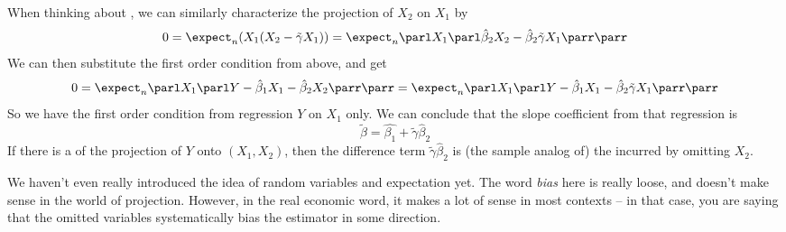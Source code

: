 \documentclass[10pt]{article}
\begin{document}
\begin{example}
	When thinking about , we can similarly characterize the projection of $X_2$ on $X_1$ by \[ 0 = \expect_n (X_1(X_2 - \tilde{\gamma}X_1)) = \expect_n \parl X_1\parl \hat{\beta}_2X_2 - \hat{\beta}_2 \tilde{\gamma}X_1\parr\parr\] We can then substitute the first order condition from above, and get \[0 = \expect_n \parl X_1 \parl Y - \hat{\beta}_1 X_1 - \hat{\beta}_2 X_2\parr \parr = \expect_n \parl X_1 \parl Y - \hat{\beta}_1 X_1 - \hat{\beta}_2\tilde{\gamma} X_1\parr \parr\] So we have the first order condition from regression $Y$ on $X_1$ only. We can conclude that the slope coefficient from that regression is \[\tilde{\beta} = \hat{\beta_1} + \tilde{\gamma} \hat{\beta}_2\] If there is a  of the projection of $Y$ onto $(X_1,X_2)$, then the difference term $\tilde{\gamma} \hat{\beta}_2$ is (the sample analog of) the  incurred by omitting $X_2$. 
	
	\begin{remark}
		We haven't even really introduced the idea of random variables and expectation yet. The word \emph{bias} here is really loose, and doesn't make sense in the world of projection. However, in the real economic word, it makes a lot of sense in most contexts -- in that case, you are saying that the omitted variables systematically bias the estimator in some direction.
	\end{remark}
\end{example}
\end{document}
